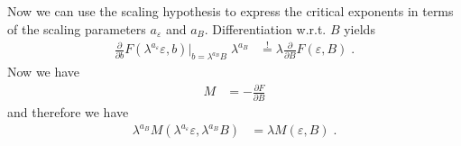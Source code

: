 Now we can use the scaling hypothesis to express the critical exponents
in terms of the scaling parameters $a_{\varepsilon}$ and $a_{B}$.
Differentiation w.r.t. $B$ yields
%
\begin{align*}
 \frac{\partial }{\partial b}
 F(\lambda^{a_{\varepsilon}}\varepsilon,b) \bigg|_{b= \lambda^{a_{B}}B}
\; \lambda^{a_{B}}
&\overset{!}{=} \lambda
\frac{\partial }{\partial B}
F(\varepsilon,B)\;.
\end{align*}
%
Now we have 
%
\begin{align*}
M &= -\frac{\partial F}{\partial B}
\end{align*}
%
and therefore  we have
%
\begin{align}
\lambda^{a_{B}} 
M(\lambda^{a_{\varepsilon}}\varepsilon,\lambda^{a_{B}}B) 
&= \lambda M(\varepsilon,B)\;.
\end{align}
%
